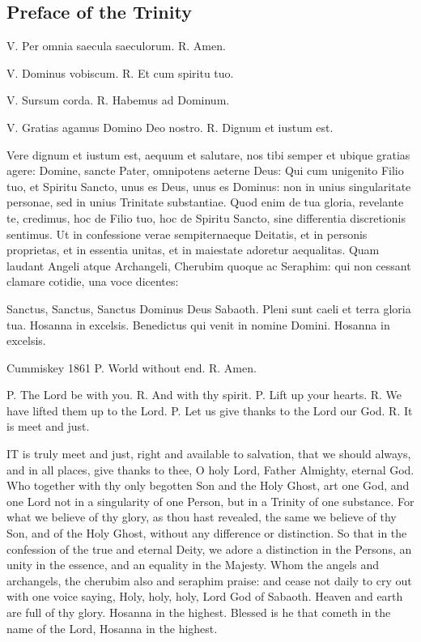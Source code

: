 \subsection{Preface of the Trinity}
\label{proper-preface}
\begin{latinproper}
V. Per omnia saecula saeculorum. R. Amen.

V. Dominus vobiscum. R. Et cum spiritu tuo.

V. Sursum corda. R. Habemus ad Dominum.

V. Gratias agamus Domino Deo nostro. R. Dignum et iustum est.

Vere dignum et iustum est, aequum et salutare, nos tibi semper et ubique gratias agere: Domine, sancte Pater, omnipotens aeterne Deus: Qui cum unigenito Filio tuo, et Spiritu Sancto, unus es Deus, unus es Dominus: non in unius singularitate personae, sed in unius Trinitate substantiae. Quod enim de tua gloria, revelante te, credimus, hoc de Filio tuo, hoc de Spiritu Sancto, sine differentia discretionis sentimus. Ut in confessione verae sempiternaeque Deitatis, et in personis proprietas, et in essentia unitas, et in maiestate adoretur aequalitas. Quam laudant Angeli atque Archangeli, Cherubim quoque ac Seraphim: qui non cessant clamare cotidie, una voce dicentes:

Sanctus, Sanctus, Sanctus Dominus Deus Sabaoth. Pleni sunt caeli et terra gloria tua. Hosanna in excelsis. Benedictus qui venit in nomine Domini. Hosanna in excelsis.
\end{latinproper}
\begin{englishwitness}{Cummiskey 1861}
P. World without end. R. Amen.

P. The Lord be with you. R. And with thy spirit. P. Lift up your hearts. R. We have lifted them up to the Lord. P. Let us give thanks to the Lord our God. R. It is meet and just.

IT is truly meet and just, right and available to salvation, that we should always, and in all places, give thanks to thee, O holy Lord, Father Almighty, eternal God. Who together with thy only begotten Son and the Holy Ghost, art one God, and one Lord not in a singularity of one Person, but in a Trinity of one substance. For what we believe of thy glory, as thou hast revealed, the same we believe of thy Son, and of the Holy Ghost, without any difference or distinction. So that in the confession of the true and eternal Deity, we adore a distinction in the Persons, an unity in the essence, and an equality in the Majesty. Whom the angels and archangels, the cherubim also and seraphim praise: and cease not daily to cry out with one voice saying, Holy, holy, holy, Lord God of Sabaoth. Heaven and earth are full of thy glory. Hosanna in the highest. Blessed is he that cometh in the name of the Lord, Hosanna in the highest.
\end{englishwitness}

